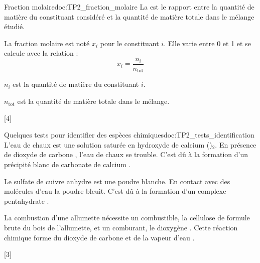 \begin{doc}{Fraction molaire}{doc:TP2_fraction_molaire}
  La  est le rapport entre la quantité de matière du constituant considéré et la quantité de matière totale dans le mélange étudié.

  La fraction molaire est noté $x_i$ pour le constituant $i$. Elle varie entre 0 et 1 et se calcule avec la relation :
  \begin{equation*}
    x_i = \dfrac{n_i}{n_\text{tot}}
  \end{equation*}

  $n_i$ est la quantité de matière du constituant $i$.

  $n_\text{tot}$ est la quantité de matière totale dans le mélange.
\end{doc}

[4]


\begin{doc}{Quelques tests pour identifier des espèces chimiques}{doc:TP2_tests_identification}
  \pointCyan L'eau de chaux est une solution saturée en hydroxyde de calcium ()$_2$.
  En présence de dioxyde de carbone \dioxydeDeCarbone, l'eau de chaux se trouble. C'est dû à la formation d'un précipité blanc de carbonate de calcium .

  \pointCyan Le sulfate de cuivre anhydre  est une poudre blanche.
  En contact avec des molécules d'eau \eau la poudre bleuit. C'est dû à la formation d'un complexe pentahydrate .

  \pointCyan La combustion d'une allumette nécessite un combustible, la cellulose de formule brute  du bois de l'allumette, et un comburant, le dioxygène \dioxygene.
  Cette réaction chimique forme du dioxyde de carbone \dioxydeDeCarbone et de la vapeur d'eau \eau.
\end{doc}

[3]



